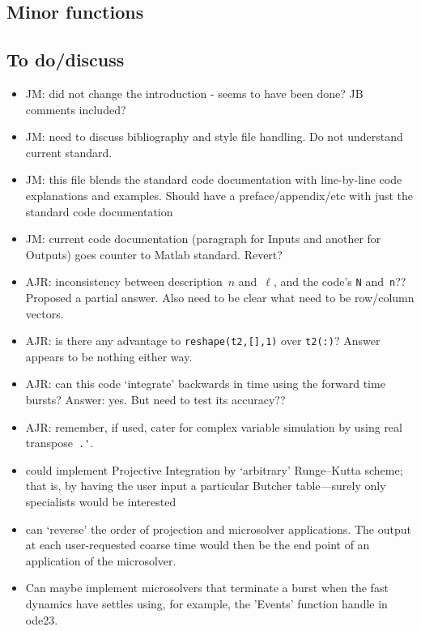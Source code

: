 



\begin{body}



\subsection{Minor functions}
\label{sec:extras}






\subsection{To do/discuss}
\begin{itemize}
\item JM: did not change the introduction - seems to have been done? JB comments included?
\item JM: need to discuss bibliography and style file handling. Do not understand current standard.
\item JM: this file blends the standard code documentation with line-by-line code explanations and examples. Should have a preface/appendix/etc with just the standard code documentation
\item JM: current code documentation (paragraph for Inputs and another for Outputs) goes counter to Matlab standard. Revert?
\item AJR: inconsistency between description~\(n\) and~\(\ell\), and the code's \verb|N| and~\verb|n|??  Proposed a partial answer.  Also need to be clear what need to be row/column vectors.
\item AJR: is there any advantage to \verb|reshape(t2,[],1)| over \verb|t2(:)|?  Answer appears to be nothing either way.
\item AJR: can this code `integrate' backwards in time using the forward time bursts? Answer: yes. But need to test its accuracy??
\item AJR: remember, if used, cater for complex variable simulation by using real transpose~\verb|.'|.
\item could implement Projective Integration by `arbitrary' Runge--Kutta scheme; that is, by having the user input a particular Butcher table---surely only specialists would be interested
\item can `reverse' the order of projection and microsolver applications.
The output at each user-requested coarse time would then be the end point of an application of the microsolver.
\item Can maybe implement microsolvers that terminate a burst when the fast dynamics have settles using, for example, the 'Events' function handle in ode23. 
\end{itemize}

\end{body}



